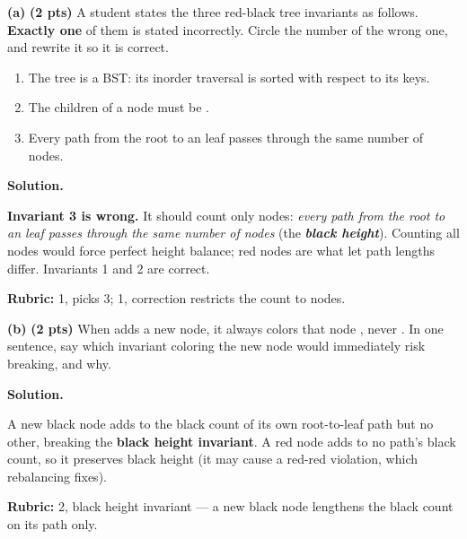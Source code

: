 \documentclass[crop=false]{standalone}
\newif\ifsol
\newenvironment{solution}
    {\par\color{solution_color}\begin{framed}\textbf{Solution.}\par}
    {\end{framed}}
\newcommand{\term}[1]{\textbf{\textit{#1}}}
\newcommand{\subpts}[1]{\textbf{(#1 pts)}}
\newcommand{\answerspace}[1]{\ifsol\else\vspace{#1}\par\fi}
\begin{document}
\textbf{(a)} \subpts{2} A student states the three red-black tree
invariants as follows. \textbf{Exactly one} of them is stated
incorrectly. Circle the number of the wrong one, and rewrite it so it
is correct.

\begin{enumerate}
  \item The tree is a BST: its inorder traversal is sorted with respect
    to its keys.
  \item The children of a  node must be .
  \item Every path from the root to an  leaf passes through
    the same number of nodes.
\end{enumerate}

\answerspace{4.5cm}

\begin{solution}
\textbf{Invariant 3 is wrong.} It should count only  nodes:
\emph{every path from the root to an  leaf passes through the
same number of  nodes} (the \term{black height}). Counting
all nodes would force perfect height balance; red nodes are what let path
lengths differ. Invariants 1 and 2 are correct.

\textbf{Rubric:} 1, picks 3; 1, correction restricts the count to
 nodes.
\end{solution}

\textbf{(b)} \subpts{2} When  adds a new node, it always
colors that node , never . In one sentence, say
which invariant coloring the new node  would immediately
risk breaking, and why.

\answerspace{3.5cm}

\begin{solution}
A new black node adds to the black count of its own root-to-leaf path
but no other, breaking the \textbf{black height invariant}. A red node
adds to no path's black count, so it preserves black height (it may
cause a red-red violation, which rebalancing fixes).

\textbf{Rubric:} 2, black height invariant --- a new black node
lengthens the black count on its path only.
\end{solution}

\newpage

\end{document}
